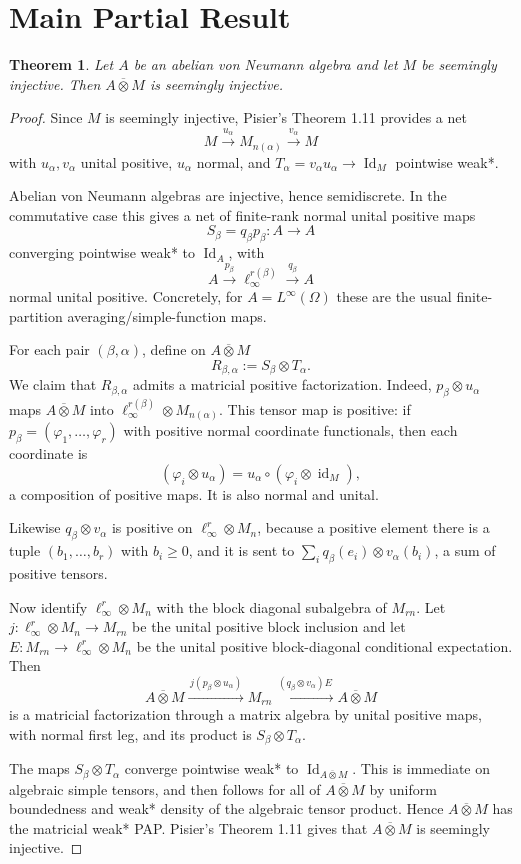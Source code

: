 \documentclass[11pt]{article}
\newtheorem{theorem}{Theorem}
\newcommand{\vN}{von Neumann}
\newcommand{\otv}{\mathbin{\overline{\otimes}}}
\newcommand{\id}{\operatorname{id}}
\begin{document}
\section*{Main Partial Result}

\begin{theorem}
Let \(A\) be an abelian \vN{} algebra and let \(M\) be seemingly injective.
Then \(A\otv M\) is seemingly injective.
\end{theorem}

\begin{proof}
Since \(M\) is seemingly injective, Pisier's Theorem 1.11 provides a net
\[
  M \xrightarrow{u_\alpha} M_{n(\alpha)}
  \xrightarrow{v_\alpha} M
\]
with \(u_\alpha,v_\alpha\) unital positive, \(u_\alpha\) normal, and
\(T_\alpha=v_\alpha u_\alpha\to \operatorname{Id}_M\) pointwise weak*.

Abelian \vN{} algebras are injective, hence semidiscrete. In the commutative
case this gives a net of finite-rank normal unital positive maps
\[
  S_\beta=q_\beta p_\beta:A\to A
\]
converging pointwise weak* to \(\operatorname{Id}_A\), with
\[
  A \xrightarrow{p_\beta} \ell_\infty^{r(\beta)}
  \xrightarrow{q_\beta} A
\]
normal unital positive. Concretely, for \(A=L^\infty(\Omega)\) these are the
usual finite-partition averaging/simple-function maps.

For each pair \((\beta,\alpha)\), define on \(A\otv M\)
\[
  R_{\beta,\alpha}:=S_\beta\otimes T_\alpha .
\]
We claim that \(R_{\beta,\alpha}\) admits a matricial positive factorization.
Indeed, \(p_\beta\otimes u_\alpha\) maps \(A\otv M\) into
\(\ell_\infty^{r(\beta)}\otimes M_{n(\alpha)}\). This tensor map is positive:
if \(p_\beta=(\varphi_1,\ldots,\varphi_r)\) with positive normal coordinate
functionals, then each coordinate is
\[
  (\varphi_i\otimes u_\alpha)
  =u_\alpha\circ(\varphi_i\otimes \id_M),
\]
a composition of positive maps. It is also normal and unital.

Likewise \(q_\beta\otimes v_\alpha\) is positive on
\(\ell_\infty^r\otimes M_n\), because a positive element there is a tuple
\((b_1,\ldots,b_r)\) with \(b_i\geq 0\), and it is sent to
\(\sum_i q_\beta(e_i)\otimes v_\alpha(b_i)\), a sum of positive tensors.

Now identify \(\ell_\infty^r\otimes M_n\) with the block diagonal subalgebra
of \(M_{rn}\). Let \(j:\ell_\infty^r\otimes M_n\to M_{rn}\) be the unital
positive block inclusion and let \(E:M_{rn}\to \ell_\infty^r\otimes M_n\)
be the unital positive block-diagonal conditional expectation. Then
\[
  A\otv M
  \xrightarrow{\,j(p_\beta\otimes u_\alpha)\,} M_{rn}
  \xrightarrow{\,(q_\beta\otimes v_\alpha)E\,} A\otv M
\]
is a matricial factorization through a matrix algebra by unital positive
maps, with normal first leg, and its product is \(S_\beta\otimes T_\alpha\).

The maps \(S_\beta\otimes T_\alpha\) converge pointwise weak* to
\(\operatorname{Id}_{A\otv M}\). This is immediate on algebraic simple
tensors, and then follows for all of \(A\otv M\) by uniform boundedness and
weak* density of the algebraic tensor product. Hence \(A\otv M\) has the
matricial weak* PAP. Pisier's Theorem 1.11 gives that \(A\otv M\) is
seemingly injective.
\end{proof}
\end{document}
